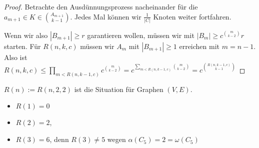 \begin{st}[Ramsey, 1930]
\begin{proof}
        Betrachte den Ausdünnungsprozess nacheinander für die $a_{m+1} \in K \in \binom{A_{m+1}}{k-1}$.
        Jedes Mal können wir $\frac{1}{|C|}$ Knoten weiter fortfahren.

        Wenn wir also $|B_{m+1}| \ge r$ garantieren wollen, müssen wir mit $|B_m| \ge c^{\binom{m}{k-2}} r$ starten.
        Für $R(n,k,c)$ müssen wir $A_m$ mit $|B_{m+1}| \ge 1$ erreichen mit $m = n - 1$.
        Also ist
        \begin{math}
            R(n,k,c) \le \prod_{m < R(n,k-1,c)} c^{\binom{m}{k-2}}
            = c^{\sum_{m < R(n,k-1,c)} \binom{m}{k-2}}
            = c^{\binom{R(n,k-1,c)}{k-1}}
        \end{math}
    \end{proof}
\end{st}

\begin{ex}
    $R(n) := R(n, 2, 2)$ ist die Situation für Graphen $(V, E)$.
    \begin{itemize}
        \item
            $R(1) = 0$
        \item
            $R(2) = 2$,
        \item
            $R(3) = 6$,
            denn $R(3) \neq 5$ wegen
            $\alpha(C_5) = 2 = \omega(C_5)$
    \end{itemize}
\end{ex}
